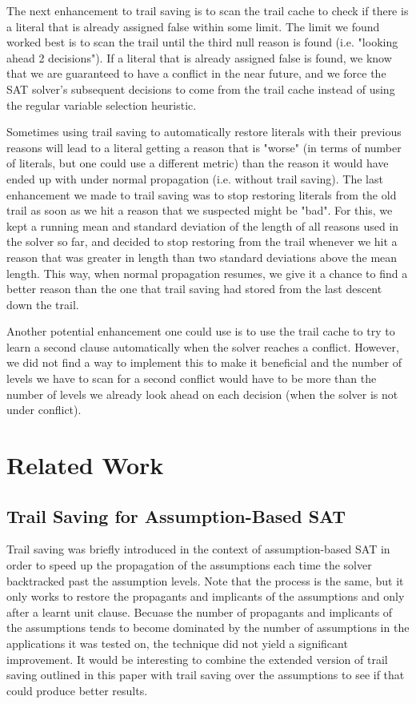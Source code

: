 \documentclass{article}
\begin{document}
The next enhancement to trail saving is to scan the trail cache to check if there is a literal that is already assigned false within some limit. The limit we found worked best is to scan the trail until the third null reason is found (i.e. "looking ahead 2 decisions"). If a literal that is already assigned false is found, we know that we are guaranteed to have a conflict in the near future, and we force the SAT solver's subsequent decisions to come from the trail cache instead of using the regular variable selection heuristic.

Sometimes using trail saving to automatically restore literals with their previous reasons will lead to a literal getting a reason that is "worse" (in terms of number of literals, but one could use a different metric) than the reason it would have ended up with under normal propagation (i.e. without trail saving). The last enhancement we made to trail saving was to stop restoring literals from the old trail as soon as we hit a reason that we suspected might be "bad". For this, we kept a running mean and standard deviation of the length of all reasons used in the solver so far, and decided to stop restoring from the trail whenever we hit a reason that was greater in length than two standard deviations above the mean length. This way, when normal propagation resumes, we give it a chance to find a better reason than the one that trail saving had stored from the last descent down the trail.

Another potential enhancement one could use is to use the trail cache to try to learn a second clause automatically when the solver reaches a conflict. However, we did not find a way to implement this to make it beneficial and the number of levels we have to scan for a second conflict would have to be more than the number of levels we already look ahead on each decision (when the solver is not under conflict).

\section{Related Work}
\subsection{Trail Saving for Assumption-Based SAT}
Trail saving was briefly introduced in the context of assumption-based SAT \cite{DBLP:conf/sat/HickeyB19} in order to speed up the propagation of the assumptions each time the solver backtracked past the assumption levels. Note that the process is the same, but it only works to restore the propagants and implicants of the assumptions and only after a learnt unit clause. Becuase the number of propagants and implicants of the assumptions tends to become dominated by the number of assumptions in the applications it was tested on, the technique did not yield a significant improvement. It would be interesting to combine the extended version of trail saving outlined in this paper with trail saving over the assumptions to see if that could produce better results. 
\end{document}
